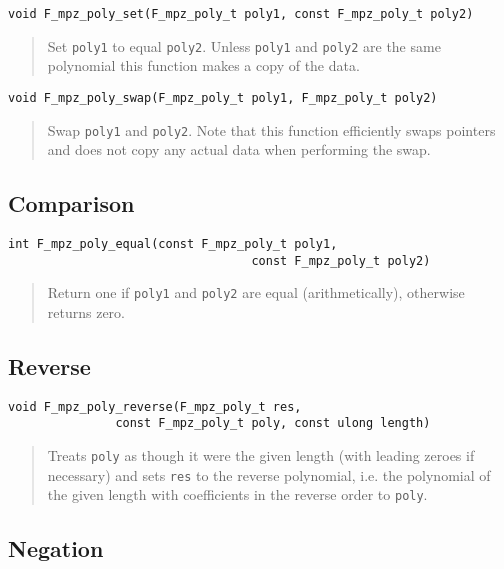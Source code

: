 \documentclass[a4paper,10pt]{article}
\newcommand{\code}{\lstinline}
\begin{document}
\begin{lstlisting}
void F_mpz_poly_set(F_mpz_poly_t poly1, const F_mpz_poly_t poly2)
\end{lstlisting}
\begin{quote}
Set \code{poly1} to equal \code{poly2}. Unless \code{poly1} and \code{poly2} are the same polynomial
this function makes a copy of the data.
\end{quote}

\begin{lstlisting}
void F_mpz_poly_swap(F_mpz_poly_t poly1, F_mpz_poly_t poly2)
\end{lstlisting}
\begin{quote}
Swap \code{poly1} and \code{poly2}. Note that this function efficiently swaps pointers and does
not copy any actual data when performing the swap.
\end{quote}

\subsection{Comparison}

\begin{lstlisting}
int F_mpz_poly_equal(const F_mpz_poly_t poly1, 
                                  const F_mpz_poly_t poly2)
\end{lstlisting}
\begin{quote}
Return one if \code{poly1} and \code{poly2} are equal (arithmetically), otherwise returns zero.
\end{quote}

\subsection{Reverse}

\begin{lstlisting}
void F_mpz_poly_reverse(F_mpz_poly_t res, 
               const F_mpz_poly_t poly, const ulong length)
\end{lstlisting}
\begin{quote}
Treats \code{poly} as though it were the given length (with leading zeroes if necessary) and sets 
\code{res} to the reverse polynomial, i.e. the polynomial of the given length with coefficients in
the reverse order to \code{poly}.
\end{quote}

\subsection{Negation}
\end{document}
